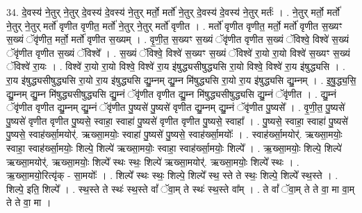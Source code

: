 \documentclass[17pt]{extarticle}
\begin{document}
34. दे॒वस्य॑ ने॒तुर् ने॒तुर् दे॒वस्य॑ दे॒वस्य॑ ने॒तुर् मर्तो॒ मर्तो॑ ने॒तुर् दे॒वस्य॑ दे॒वस्य॑ ने॒तुर् मर्तः॑ । . ने॒तुर् मर्तो॒ मर्तो॑ ने॒तुर् ने॒तुर् मर्तो॑ वृणीत वृणीत॒ मर्तो॑ ने॒तुर् ने॒तुर् मर्तो॑ वृणीत । . मर्तो॑ वृणीत वृणीत॒ मर्तो॒ मर्तो॑ वृणीत स॒ख्यꣳ स॒ख्यं ॅवृ॑णीत॒ मर्तो॒ मर्तो॑ वृणीत स॒ख्यम् । . वृ॒णी॒त॒ स॒ख्यꣳ स॒ख्यं ॅवृ॑णीत वृणीत स॒ख्यं ॅविश्वे॒ विश्वे॑ स॒ख्यं ॅवृ॑णीत वृणीत स॒ख्यं ॅविश्वे᳚ । . स॒ख्यं ॅविश्वे॒ विश्वे॑ स॒ख्यꣳ स॒ख्यं ॅविश्वे॑ रा॒यो रा॒यो विश्वे॑ स॒ख्यꣳ स॒ख्यं ॅविश्वे॑ रा॒यः । . विश्वे॑ रा॒यो रा॒यो विश्वे॒ विश्वे॑ रा॒य इ॑षुद्ध्यसीषुद्ध्यसि रा॒यो विश्वे॒ विश्वे॑ रा॒य इ॑षुद्ध्यसि । . रा॒य इ॑षुद्ध्यसीषुद्ध्यसि रा॒यो रा॒य इ॑षुद्ध्यसि द्यु॒म्नम् द्यु॒म्न मि॑षुद्ध्यसि रा॒यो रा॒य इ॑षुद्ध्यसि द्यु॒म्नम् । . इ॒षु॒द्ध्य॒सि॒ द्यु॒म्नम् द्यु॒म्न मि॑षुद्ध्यसीषुद्ध्यसि द्यु॒म्नं ॅवृ॑णीत वृणीत द्यु॒म्न मि॑षुद्ध्यसीषुद्ध्यसि द्यु॒म्नं ॅवृ॑णीत । . द्यु॒म्नं ॅवृ॑णीत वृणीत द्यु॒म्नम् द्यु॒म्नं ॅवृ॑णीत पु॒ष्यसे॑ पु॒ष्यसे॑ वृणीत द्यु॒म्नम् द्यु॒म्नं ॅवृ॑णीत पु॒ष्यसे᳚ । . वृ॒णी॒त॒ पु॒ष्यसे॑ पु॒ष्यसे॑ वृणीत वृणीत पु॒ष्यसे॒ स्वाहा॒ स्वाहा॑ पु॒ष्यसे॑ वृणीत वृणीत पु॒ष्यसे॒ स्वाहा᳚ । . पु॒ष्यसे॒ स्वाहा॒ स्वाहा॑ पु॒ष्यसे॑ पु॒ष्यसे॒ स्वाह॑र्ख्सा॒मयोर्॑. ऋख्सा॒मयोः॒ स्वाहा॑ पु॒ष्यसे॑ पु॒ष्यसे॒ स्वाह॑र्ख्सा॒मयोः᳚ । . स्वाह॑र्ख्सा॒मयोर्॑. ऋख्सा॒मयोः॒ स्वाहा॒ स्वाह॑र्ख्सा॒मयोः॒ शिल्पे॒ शिल्पे॑ ऋख्सा॒मयोः॒ स्वाहा॒ स्वाह॑र्ख्सा॒मयोः॒ शिल्पे᳚ । . ऋ॒ख्सा॒मयोः॒ शिल्पे॒ शिल्पे॑ ऋख्सा॒मयोर्॑. ऋख्सा॒मयोः॒ शिल्पे᳚ स्थः स्थः॒ शिल्पे॑ ऋख्सा॒मयोर्॑. ऋख्सा॒मयोः॒ शिल्पे᳚ स्थः । . ऋ॒ख्सा॒मयो॒रित्यृ॑क् - सा॒मयोः᳚ । . शिल्पे᳚ स्थः स्थः॒ शिल्पे॒ शिल्पे᳚ स्थ॒ स्ते ते स्थः॒ शिल्पे॒ शिल्पे᳚ स्थ॒स्ते । . शिल्पे॒ इति॒ शिल्पे᳚ । . स्थ॒स्ते ते स्थः॑ स्थ॒स्ते वां᳚ ॅवा॒म् ते स्थः॑ स्थ॒स्ते वा᳚म् । . ते वां᳚ ॅवा॒म् ते ते वा॒ मा वा॒म् ते ते वा॒ मा । \newline
\end{document}
